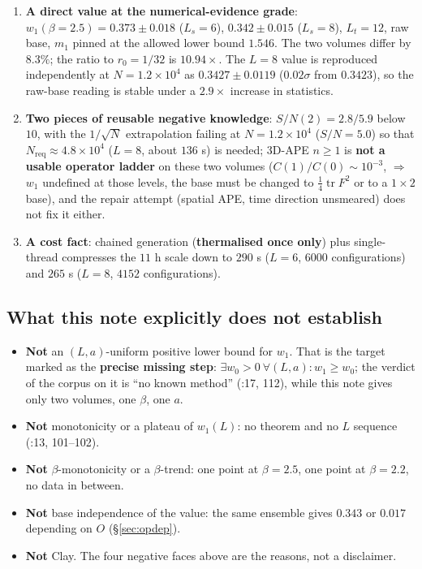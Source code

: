 \documentclass[11pt,a4paper]{article}
\newcommand{\code}[1]{\texttt{\footnotesize\detokenize{#1}}}
\begin{document}
\begin{enumerate}
\item \textbf{A direct value at the numerical-evidence grade}: $w_1(\beta=2.5)=0.373\pm0.018$ ($L_s=6$), $0.342\pm0.015$ ($L_s=8$),
$L_t=12$, raw base, $m_1$ pinned at the allowed lower bound $1.546$. The two volumes differ by $8.3\%$; the ratio to $r_0=1/32$ is $10.94\times$.
The $L=8$ value is reproduced independently at $N=1.2\times10^4$ as $0.3427\pm0.0119$ ($0.02\sigma$ from $0.3423$), so the raw-base reading is
stable under a $2.9\times$ increase in statistics.
\item \textbf{Two pieces of reusable negative knowledge}: $S/N(2)=2.8/5.9$ below $10$, with the $1/\sqrt N$ extrapolation failing at
$N=1.2\times10^4$ ($S/N=5.0$) so that $N_{\text{req}}\approx4.8\times10^4$ ($L=8$, about $136$ s) is needed;
3D-APE $n\ge1$ is \textbf{not a usable operator ladder} on these two volumes ($C(1)/C(0)\sim10^{-3}$,
$\Rightarrow$ $w_1$ undefined at those levels, the base must be changed to $\tfrac14\operatorname{tr}F^2$ or to a $1\times2$ base), and the repair
attempt (spatial APE, time direction unsmeared) does not fix it either.
\item \textbf{A cost fact}: chained generation (\textbf{thermalised once only}) plus single-thread \code{njit} compresses the $11$ h scale down to
$290$ s ($L=6$, $6000$ configurations) and $265$ s ($L=8$, $4152$ configurations).
\end{enumerate}

\subsection*{What this note explicitly does not establish}

\begin{itemize}
\item \textbf{Not} an $(L,a)$-uniform positive lower bound for $w_1$. That is the target marked as the \textbf{precise missing step}:
$\exists w_0>0\ \forall(L,a): w_1\ge w_0$; the verdict of the corpus on it is ``no known method'' (\code{U15.md}:17, 112), while this note gives
only two volumes, one $\beta$, one $a$.
\item \textbf{Not} monotonicity or a plateau of $w_1(L)$: no theorem and no $L$ sequence (\code{U02.md}:13, 101--102).
\item \textbf{Not} $\beta$-monotonicity or a $\beta$-trend: one point at $\beta=2.5$, one point at $\beta=2.2$, no data in between.
\item \textbf{Not} base independence of the value: the same ensemble gives $0.343$ or $0.017$ depending on $O$ (\S\ref{sec:opdep}).
\item \textbf{Not} Clay. The four negative faces above are the reasons, not a disclaimer.
\end{itemize}
\end{document}
